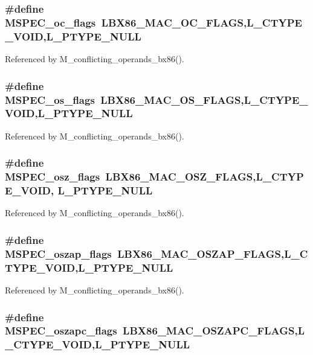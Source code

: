 \subsubsection{\setlength{\rightskip}{0pt plus 5cm}\#define MSPEC\_\-oc\_\-flags~LBX86\_\-MAC\_\-OC\_\-FLAGS,L\_\-CTYPE\_\-VOID,L\_\-PTYPE\_\-NULL}\label{ml__bx86_8c_ed63d41bd4f8877ad270078c673730fc}




Referenced by M\_\-conflicting\_\-operands\_\-bx86().
\subsubsection{\setlength{\rightskip}{0pt plus 5cm}\#define MSPEC\_\-os\_\-flags~LBX86\_\-MAC\_\-OS\_\-FLAGS,L\_\-CTYPE\_\-VOID,L\_\-PTYPE\_\-NULL}\label{ml__bx86_8c_9564591a7a19759249d7043e99952e65}




Referenced by M\_\-conflicting\_\-operands\_\-bx86().
\subsubsection{\setlength{\rightskip}{0pt plus 5cm}\#define MSPEC\_\-osz\_\-flags~LBX86\_\-MAC\_\-OSZ\_\-FLAGS,L\_\-CTYPE\_\-VOID, L\_\-PTYPE\_\-NULL}\label{ml__bx86_8c_428e2b82269ad2a17ea6c7eef670086c}




Referenced by M\_\-conflicting\_\-operands\_\-bx86().
\subsubsection{\setlength{\rightskip}{0pt plus 5cm}\#define MSPEC\_\-oszap\_\-flags~LBX86\_\-MAC\_\-OSZAP\_\-FLAGS,L\_\-CTYPE\_\-VOID,L\_\-PTYPE\_\-NULL}\label{ml__bx86_8c_d2c22c6cc74376448c0265581719363e}




Referenced by M\_\-conflicting\_\-operands\_\-bx86().
\subsubsection{\setlength{\rightskip}{0pt plus 5cm}\#define MSPEC\_\-oszapc\_\-flags~LBX86\_\-MAC\_\-OSZAPC\_\-FLAGS,L\_\-CTYPE\_\-VOID,L\_\-PTYPE\_\-NULL}\label{ml__bx86_8c_ce8823a3f5cbe6ca6b83e6e9bbcb841a}




